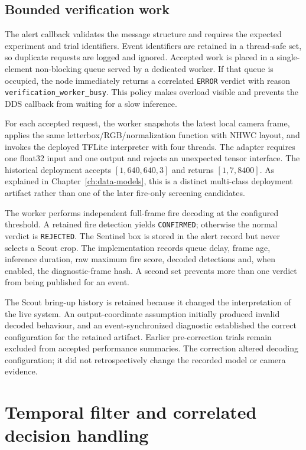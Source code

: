\subsection{Bounded verification work}

The alert callback validates the message structure and requires the expected
experiment and trial identifiers. Event identifiers are retained in a
thread-safe set, so duplicate requests are logged and ignored. Accepted work is
placed in a single-element non-blocking queue served by a dedicated worker. If
that queue is occupied, the node immediately returns a correlated
\texttt{ERROR} verdict with reason \texttt{verification\_worker\_busy}. This
policy makes overload visible and prevents the DDS callback from waiting for a
slow inference.

For each accepted request, the worker snapshots the latest local camera frame,
applies the same letterbox/RGB/normalization function with NHWC layout, and
invokes the deployed TFLite interpreter with four threads. The adapter requires
one float32 input and one output and rejects an unexpected tensor interface.
The historical deployment accepts $[1,640,640,3]$ and returns
$[1,7,8400]$. As explained in Chapter~\ref{ch:data-models}, this is a distinct
multi-class deployment artifact rather than one of the later fire-only
screening candidates.

The worker performs independent full-frame fire decoding at the configured
threshold. A retained fire detection yields \texttt{CONFIRMED}; otherwise the
normal verdict is \texttt{REJECTED}. The Sentinel box is stored in the alert
record but never selects a Scout crop. The implementation records queue delay,
frame age, inference duration, raw maximum fire score, decoded detections and,
when enabled, the diagnostic-frame hash. A second set prevents more than one
verdict from being published for an event.

The Scout bring-up history is retained because it changed the interpretation of
the live system. An output-coordinate assumption initially produced invalid
decoded behaviour, and an event-synchronized diagnostic established the
correct configuration for the retained artifact. Earlier pre-correction trials
remain excluded from accepted performance summaries. The correction altered
decoding configuration; it did not retrospectively change the recorded model
or camera evidence.

\section{Temporal filter and correlated decision handling}
\label{sec:implementation:coordination}

